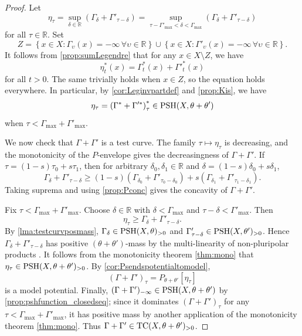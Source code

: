 \begin{proof}
    Let
    \[
    \eta_{\tau}=\sup_{\delta\in \mathbb{R}} \left(\Gamma_\delta+\Gamma'_{\tau-\delta}\right)=\sup_{\tau-\Gamma'_{\max}<\delta<\Gamma_{\max}}\left(\Gamma_\delta+\Gamma'_{\tau-\delta}\right)
    \]
    for all $\tau\in \mathbb{R}$.
    Set
    \[
    Z=\left\{x\in X: \Gamma_{\upsilon}(x)=-\infty \,\forall \upsilon\in \mathbb{R}\right\}\cup \left\{x\in X: \Gamma'_{\upsilon}(x)=-\infty \,\forall \upsilon\in \mathbb{R}\right\}.
    \]
    It follows from \cref{prop:sumLegendre} that for any $x\in X\setminus Z$, we have
    \[
    \eta^*_t(x)=\Gamma^*_t(x)+\Gamma'^*_t(x)
    \]
    for all $t>0$.
    The same trivially holds when $x\in Z$, so the equation holds everywhere. In particular, by \cref{cor:Leginvpartdef} and \cref{prop:Kis}, we have
    \[
    \eta_{\tau}=\left(\Gamma^*+\Gamma'^*\right)^*_{\tau}\in \mathrm{PSH}(X,\theta+\theta')
    \]
    when $\tau<\Gamma_{\max}+\Gamma'_{\max}$.

    We now check that $\Gamma+\Gamma'$ is a test curve. The family $\tau\mapsto\eta_\tau$ is decreasing, and the monotonicity of the $P$-envelope  gives the decreasingness of $\Gamma+\Gamma'$. If $\tau=(1-s)\tau_0+s\tau_1$, then for arbitrary $\delta_0,\delta_1\in \mathbb{R}$ and $\delta=(1-s)\delta_0+s\delta_1$,
    \[
    \Gamma_\delta+\Gamma'_{\tau-\delta}\geq (1-s)(\Gamma_{\delta_0}+\Gamma'_{\tau_0-\delta_0})+s(\Gamma_{\delta_1}+\Gamma'_{\tau_1-\delta_1}).
    \]
    Taking suprema and using \cref{prop:Pconc} gives the concavity of $\Gamma+\Gamma'$.

    Fix $\tau<\Gamma_{\max}+\Gamma'_{\max}$. Choose $\delta\in \mathbb{R}$ with $\delta<\Gamma_{\max}$ and $\tau-\delta<\Gamma'_{\max}$. Then
    \[
    \eta_\tau\geq \Gamma_\delta+\Gamma'_{\tau-\delta}.
    \]
    By \cref{lma:testcurvposmass}, $\Gamma_\delta\in \mathrm{PSH}(X,\theta)_{>0}$ and $\Gamma'_{\tau-\delta}\in \mathrm{PSH}(X,\theta')_{>0}$. Hence $\Gamma_\delta+\Gamma'_{\tau-\delta}$ has positive $(\theta+\theta')$-mass by the multi-linearity of non-pluripolar products . It follows from the monotonicity theorem \cref{thm:mono} that $\eta_\tau\in \mathrm{PSH}(X,\theta+\theta')_{>0}$. By \cref{cor:Psendspotentialtomodel},
    \[
        (\Gamma+\Gamma')_\tau=P_{\theta+\theta'}[\eta_\tau]
    \]
    is a model potential. Finally, $(\Gamma+\Gamma')_{-\infty}\in \mathrm{PSH}(X,\theta+\theta')$ by \cref{prop:pshfunction_closedseq}; since it dominates $(\Gamma+\Gamma')_\tau$ for any $\tau<\Gamma_{\max}+\Gamma'_{\max}$, it has positive mass by another application of the monotonicity theorem \cref{thm:mono}. Thus $\Gamma+\Gamma'\in \mathrm{TC}(X,\theta+\theta')_{>0}$.


\end{proof}
